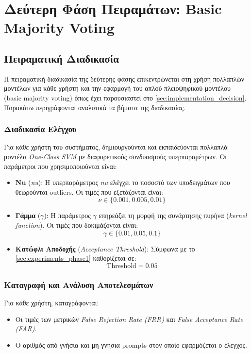 \section{Δεύτερη Φάση Πειραμάτων: Basic Majority Voting}
\label{sec:experiments_phase2}

\subsection{Πειραματική Διαδικασία}
Η πειραματική διαδικασία της δεύτερης φάσης επικεντρώνεται στη χρήση πολλαπλών μοντέλων για κάθε χρήστη και την εφαρμογή του απλού πλειοψηφικού μοντέλου (basic majority voting) όπως έχει παρουσιαστεί στο \autoref{sec:implementation_decision}. Παρακάτω περιγράφονται αναλυτικά τα βήματα της διαδικασίας.

\subsubsection{Διαδικασία Ελέγχου}
Για κάθε χρήστη του συστήματος, δημιουργούνται και εκπαιδεύονται πολλαπλά μοντέλα \emph{One-Class SVM} με διαφορετικούς συνδυασμούς υπερπαραμέτρων. Οι παράμετροι που χρησιμοποιούνται είναι:

\begin{itemize}
    \item \textbf{Νu} (\emph{nu}): Η υπερπαράμετρος \emph{nu} ελέγχει το ποσοστό των υποδειγμάτων που θεωρούνται outliers. Οι τιμές που εξετάζονται είναι:
    \[
    \nu \in \{0.001, 0.005, 0.01\}
    \]
    \item \textbf{Γάμμα} ($\gamma$): Η παράμετρος $\gamma$ επηρεάζει τη μορφή της συνάρτησης πυρήνα (\emph{kernel function}). Οι τιμές που δοκιμάζονται είναι:
    \[
    \gamma \in \{0.01, 0.05, 0.1\}
    \]
    \item \textbf{Κατώφλι Αποδοχής} (\emph{Acceptance Threshold}): Σύμφωνα με το \autoref{sec:experiments_phase1} καθορίζεται σε:
    \[
    \text{Threshold} = 0.05
    \]
\end{itemize}


\subsubsection{Καταγραφή και Ανάλυση Αποτελεσμάτων}
Για κάθε χρήστη, καταγράφονται:
\begin{itemize}
    \item Οι τιμές των μετρικών \emph{False Rejection Rate (FRR)} και \emph{False Acceptance Rate (FAR)}.
    \item Ο αριθμός από γνήσια και μη γνήσια prompts στον οποίο εφαρμόζεται ο έλεγχος.
\end{itemize}

